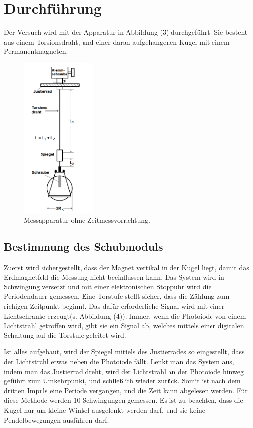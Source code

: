 \section{Durchführung}
\label{sec:Durchführung}

Der Versuch wird mit der Apparatur in Abbildung (3) durchgeführt.
Sie besteht aus einem Torsionsdraht, und einer daran aufgehangenen Kugel mit einem Permanentmagneten.

\begin{figure}[H]
 \centering
  \includegraphics[height=8cm]{Screenshot (10).png}
  \caption{Messapparatur ohne Zeitmessvorrichtung.\cite{kent}}
  \label{fig:drill}
\end{figure}


\subsection{Bestimmung des Schubmoduls}
Zuerst wird sichergestellt, dass der Magnet vertikal in der Kugel liegt, damit das Erdmagnetfeld die Messung nicht beeinflussen kann.
Das System wird in Schwingung versetzt und mit einer elektronischen Stoppuhr wird die Periodendauer gemessen.
Eine Torstufe stellt sicher, dass die Zählung zum richigen Zeitpunkt beginnt.
Das dafür erforderliche Signal wird mit einer Lichtschranke erzeugt(s. Abbildung (4)).
Immer, wenn die Photoiode von einem Lichtstrahl getroffen wird, gibt sie ein Signal ab, welches mittels einer digitalen Schaltung auf die Torstufe geleitet wird.

Ist alles aufgebaut, wird der Spiegel mittels des Justierrades so eingestellt, dass der Lichtstrahl etwas neben die Photoiode fällt.
Lenkt man das System aus, indem man das Justierrad dreht, wird der Lichtstrahl an der Photoiode hinweg geführt zum Umkehrpunkt, und schließlich wieder zurück.
Somit ist nach dem dritten Impuls eine Periode vergangen, und die Zeit kann abgelesen werden.
Für diese Methode werden 10 Schwingungen gemessen. Es ist zu beachten, dass die Kugel nur um kleine Winkel ausgelenkt werden darf, und sie keine Pendelbewegungen ausführen darf.


